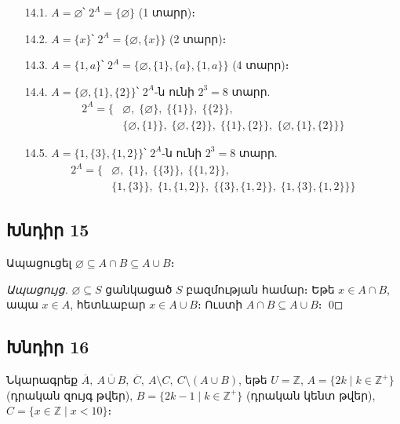 \begin{itemize}
  \item[14.1.] $A = \varnothing$՝ $\boxed{2^A = \{\varnothing\}}$ (1 տարր)։
  \item[14.2.] $A = \{x\}$՝ $\boxed{2^A = \{\varnothing, \{x\}\}}$ (2 տարր)։
  \item[14.3.] $A = \{1,a\}$՝ $\boxed{2^A = \{\varnothing, \{1\}, \{a\}, \{1,a\}\}}$ (4 տարր)։
  \item[14.4.] $A = \{\varnothing, \{1\}, \{2\}\}$՝ $2^A$-ն ունի $2^3 = 8$ տարր.
    \begin{align*}
      2^A = \bigl\{&\varnothing,\;\{\varnothing\},\;\{\{1\}\},\;\{\{2\}\},\\
      &\{\varnothing,\{1\}\},\;\{\varnothing,\{2\}\},\;\{\{1\},\{2\}\},\;\{\varnothing,\{1\},\{2\}\}\bigr\}
    \end{align*}
  \item[14.5.] $A = \{1, \{3\}, \{1,2\}\}$՝ $2^A$-ն ունի $2^3 = 8$ տարր.
    \begin{align*}
      2^A = \bigl\{&\varnothing,\;\{1\},\;\{\{3\}\},\;\{\{1,2\}\},\\
      &\{1,\{3\}\},\;\{1,\{1,2\}\},\;\{\{3\},\{1,2\}\},\;\{1,\{3\},\{1,2\}\}\bigr\}
    \end{align*}
\end{itemize}

\subsection*{Խնդիր 15}
Ապացուցել $\varnothing \subseteq A \cap B \subseteq A \cup B$։

\textit{Ապացույց.} $\varnothing \subseteq S$ ցանկացած $S$ բազմության համար։ Եթե $x \in A \cap B$, ապա $x \in A$, հետևաբար $x \in A \cup B$։ Ուստի $A \cap B \subseteq A \cup B$։ \qed

\subsection*{Խնդիր 16}
Նկարագրեք $\overline{A},\ \overline{A\cup B},\ \overline{C},\ A\setminus C,\ C\setminus(A\cup B)$, եթե $U = \mathbb{Z}$, $A = \{2k \mid k \in \mathbb{Z}^+\}$ (դրական զույգ թվեր), $B = \{2k-1 \mid k \in \mathbb{Z}^+\}$ (դրական կենտ թվեր), $C = \{x \in \mathbb{Z} \mid x < 10\}$։

